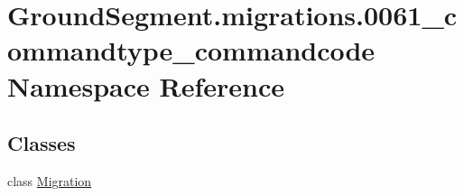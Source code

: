 \hypertarget{namespace_ground_segment_1_1migrations_1_10061__commandtype__commandcode}{}\section{Ground\+Segment.\+migrations.0061\+\_\+commandtype\+\_\+commandcode Namespace Reference}
\label{namespace_ground_segment_1_1migrations_1_10061__commandtype__commandcode}
\subsection*{Classes}
\begin{DoxyCompactItemize}
\item 
class \hyperlink{class_ground_segment_1_1migrations_1_10061__commandtype__commandcode_1_1_migration}{Migration}
\end{DoxyCompactItemize}
